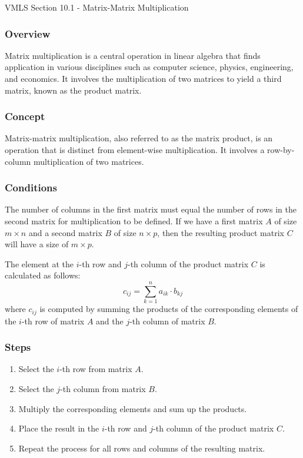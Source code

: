 \begin{notes}{VMLS Section 10.1 - Matrix-Matrix Multiplication}
    \subsubsection*{Overview}

    Matrix multiplication is a central operation in linear algebra that finds application in various disciplines such as computer science, physics, engineering, and economics. It involves the 
    multiplication of two matrices to yield a third matrix, known as the product matrix. \vspace*{1em}

    \subsubsection*{Concept}
    Matrix-matrix multiplication, also referred to as the matrix product, is an operation that is distinct from element-wise multiplication. It involves a row-by-column multiplication of two 
    matrices. \vspace*{1em}
    
    \subsubsection*{Conditions}
    The number of columns in the first matrix must equal the number of rows in the second matrix for multiplication to be defined. If we have a first matrix $A$ of size $m \times n$ 
    and a second matrix $B$ of size $n \times p$, then the resulting product matrix $C$ will have a size of $m \times p$. \vspace*{1em}

    \begin{highlight}
        The element at the $i$-th row and $j$-th column of the product matrix $C$ is calculated as follows:
        \begin{equation*}
            c_{ij} = \sum_{k=1}^{n} a_{ik} \cdot b_{kj}
        \end{equation*}
        where $c_{ij}$ is computed by summing the products of the corresponding elements of the $i$-th row of matrix $A$ and the $j$-th column of matrix $B$.
        \subsubsection*{Steps}
        \begin{enumerate}
            \item Select the $i$-th row from matrix $A$.
            \item Select the $j$-th column from matrix $B$.
            \item Multiply the corresponding elements and sum up the products.
            \item Place the result in the $i$-th row and $j$-th column of the product matrix $C$.
            \item Repeat the process for all rows and columns of the resulting matrix.
        \end{enumerate}
    \end{highlight}
    

\end{notes}
